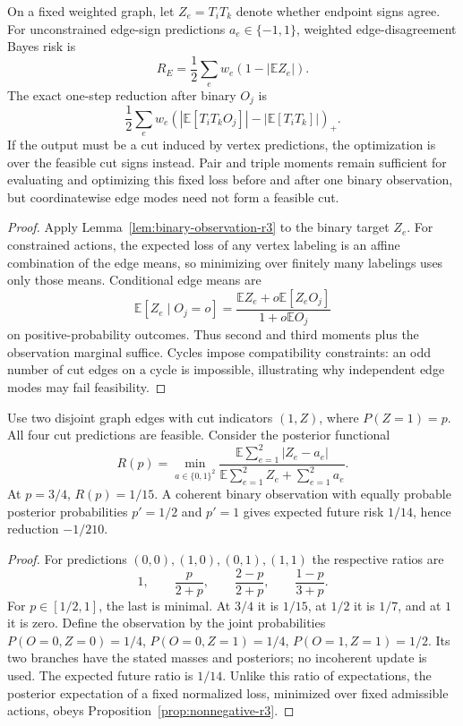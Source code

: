 \begin{proposition}
\label{prop:edge-moment-r3}
On a fixed weighted graph, let $Z_e=T_iT_k$ denote whether endpoint
signs agree. For unconstrained edge-sign predictions $a_e\in\{-1,1\}$,
weighted edge-disagreement Bayes risk is
\[
 R_E=\frac12\sum_e w_e(1-|\mathbb E Z_e|).
\]
The exact one-step reduction after binary $O_j$ is
\[
 \frac12\sum_e w_e
 (|\mathbb E[T_iT_kO_j]|-|\mathbb E[T_iT_k]|)_+.
\]
If the output must be a cut induced by vertex predictions, the
optimization is over the feasible cut signs instead. Pair and triple
moments remain sufficient for evaluating and optimizing this fixed
loss before and after one binary observation, but coordinatewise edge
modes need not form a feasible cut.
\end{proposition}
\begin{proof}
Apply Lemma~\ref{lem:binary-observation-r3} to the binary target $Z_e$.
For constrained actions, the expected loss of any vertex labeling is
an affine combination of the edge means, so minimizing over finitely
many labelings uses only those means. Conditional edge means are
\[
 \mathbb E[Z_e\mid O_j=o]
 =\frac{\mathbb E Z_e+o\mathbb E[Z_eO_j]}
        {1+o\mathbb E O_j}
\]
on positive-probability outcomes. Thus second and third moments plus
the observation marginal suffice. Cycles impose compatibility
constraints: an odd number of cut edges on a cycle is impossible,
illustrating why independent edge modes may fail feasibility.
\end{proof}

\begin{counterexample}
\label{ce:optimized-ratio-r3}
Use two disjoint graph edges with cut indicators $(1,Z)$, where
$P(Z=1)=p$. All four cut predictions are feasible. Consider the
posterior functional
\[
 R(p)=\min_{a\in\{0,1\}^2}
 \frac{\mathbb E\sum_{e=1}^2|Z_e-a_e|}
      {\mathbb E\sum_{e=1}^2 Z_e+\sum_{e=1}^2a_e}.
\]
At $p=3/4$, $R(p)=1/15$. A coherent binary observation with equally
probable posterior probabilities $p'=1/2$ and $p'=1$ gives expected
future risk $1/14$, hence reduction $-1/210$.
\end{counterexample}
\begin{proof}
For predictions $(0,0),(1,0),(0,1),(1,1)$ the respective ratios are
\[
 1,\qquad \frac p{2+p},\qquad\frac{2-p}{2+p},
 \qquad\frac{1-p}{3+p}.
\]
For $p\in[1/2,1]$, the last is minimal. At $3/4$ it is $1/15$,
at $1/2$ it is $1/7$, and at $1$ it is zero.
Define the observation by the joint probabilities
$P(O=0,Z=0)=1/4$, $P(O=0,Z=1)=1/4$,
$P(O=1,Z=1)=1/2$. Its two branches have the stated masses and
posteriors; no incoherent update is used. The expected future ratio
is $1/14$. Unlike this ratio of expectations, the posterior expectation
of a fixed normalized loss, minimized over fixed admissible actions,
obeys Proposition~\ref{prop:nonnegative-r3}.
\end{proof}

